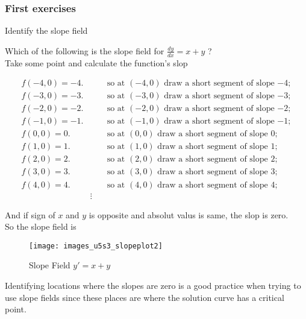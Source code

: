 \clearpage

\subsubsection{First exercises}

\begin{exercise}
  Identify the slope field
\end{exercise}

Which of the following is the slope field for $\displaystyle \frac{dy}{dx} = x + y$ ?\\
Take some point and calculate the function's slop

\begin{align*}
  f(-4,0)=-4. &\qquad \text{so at $(-4,0)$ draw a short segment of slope $-4$}; \\
  f(-3,0)=-3. &\qquad \text{so at $(-3,0)$ draw a short segment of slope $-3$}; \\
  f(-2,0)=-2. &\qquad \text{so at $(-2,0)$ draw a short segment of slope $-2$}; \\
  f(-1,0)=-1. &\qquad \text{so at $(-1,0)$ draw a short segment of slope $-1$}; \\
  f(0,0)=0. &\qquad \text{so at $(0,0)$ draw a short segment of slope $0$}; \\
  f(1,0)=1. &\qquad \text{so at $(1,0)$ draw a short segment of slope $1$}; \\
  f(2,0)=2. &\qquad \text{so at $(2,0)$ draw a short segment of slope $2$}; \\
  f(3,0)=3. &\qquad \text{so at $(3,0)$ draw a short segment of slope $3$}; \\
  f(4,0)=4. &\qquad \text{so at $(4,0)$ draw a short segment of slope $4$};\\
            & \vdots
\end{align*}

And if sign of $x$ and $y$ is opposite and absolut valus is same, the slop is zero.\\
So the slope field is

\begin{figure}[ht!]
  \centering
  \texttt{[image: images\_u5s3\_slopeplot2]}
  \caption{Slope Field $y' = x + y$}
\end{figure}

Identifying locations where the slopes are zero is a good practice
when trying to use slope fields since these places are where the solution curve has a critical point.

